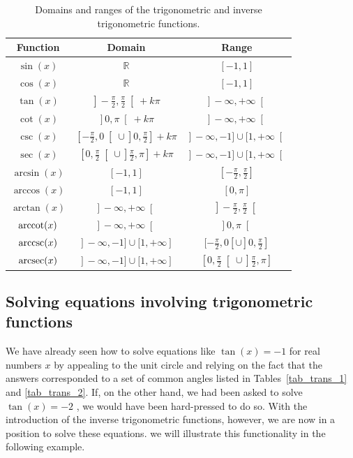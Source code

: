\begin{table}
\begin{tabular}{c|cc}
Function & Domain & Range \\ \hline\hline
\rule{0pt}{12pt} $\sin (x)$ & $\mathbb{R}$ & $[-1,1]$\\
\rule{0pt}{12pt}$\cos (x)$ & $\mathbb{R}$ & $[-1,1]$ \\
\rule{0pt}{12pt}$\tan (x)$ & $\left.\right]-\frac{\pi}{2},\frac{\pi}{2}\left.\right[+k\pi$ & $\left.\right]-\infty,+\infty\left.\right[$	\\
\rule{0pt}{12pt}$\cot (x)$ & $\left.\right]0,\pi\left.\right[+k\pi$ & $\left.\right]-\infty,+\infty\left.\right[$\\
\rule{0pt}{12pt} $\csc (x)$ & $[-\frac{\pi}{2},0\left.\right[\cup \left.\right]0, \frac{\pi}{2}]+k\pi$ & $\left.\right]-\infty,-1]\cup [1,+\infty\left.\right[$\\
\rule{0pt}{12pt}$\sec (x)$ & $[0,\frac{\pi}{2}\left.\right[\cup \left.\right]\frac{\pi}{2},\pi]+k\pi$ & $\left.\right]-\infty,-1]\cup [1,+\infty\left.\right[$ \\[0.25cm] \hline
$\arcsin (x)$ & $[-1,1]$ & $[-\frac{\pi}{2}, \frac{\pi}{2}]$ \\[0.1cm]
$\arccos (x) $ & $[-1,1]$ & $[0,\pi]$\\[0.1cm]
$\arctan (x) $ & $\left.\right]-\infty,+\infty\left.\right[$ & $\left.\right]-\frac{\pi}{2},\frac{\pi}{2}\left.\right[$\\[0.1cm]
$\operatorname{arccot} (x) $ &  $ \left.\right]-\infty,+\infty\left.\right[$ & $\left.\right]0,\pi\left.\right[$	\\[0.1cm]
 $\operatorname{arccsc} (x)$ & $\left.\right]-\infty,-1]\cup [1,+\infty\left.\right]$ & $[-\frac{\pi}{2},0[\cup \left.\right]0, \frac{\pi}{2}]$  \\[0.1cm]
$\operatorname{arcsec} (x)$ & $\left.\right]-\infty,-1]\cup [1,+\infty\left.\right]$ & $[0,\frac{\pi}{2}\left.\right[\cup \left.\right]\frac{\pi}{2},\pi]$\\[0.1cm]
\hline\hline
\end{tabular}
\caption{Domains and ranges of the trigonometric and inverse trigonometric functions.}\label{tab_res_tri}
\end{table}


\fi
\fi



\ifvc
\subsection{Solving equations involving trigonometric functions}
We have already seen how to solve equations like $\tan(x) = -1$ for real numbers $x$ by appealing to the unit circle and relying on the fact that the answers corresponded to a set of common angles listed in Tables~\ref{tab_trans_1} and \ref{tab_trans_2}.  If, on the other hand, we had been asked to solve $\tan(x) = -2$ , we would have been hard-pressed to do so.  With the introduction of the inverse trigonometric functions, however, we are now in a position to solve these equations.  we will illustrate this functionality in the following example.

